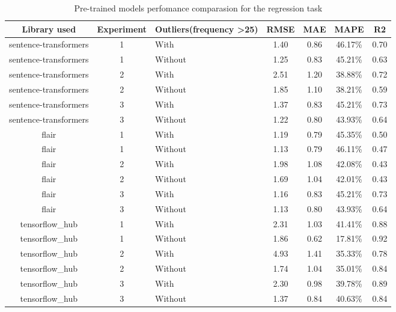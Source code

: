 \documentclass[12pt,MSc,a4paper,oneside]{muthesis}
\begin{document}
\begin{table}[h]
  \caption{Pre-trained models perfomance comparasion for the regression task}
  \label{tab:pretrained-models}
  \begin{tabularx}{\textwidth}{|C|C|L|C|C|C|C|}
    \toprule
    {Library used}&{Experiment}&{Outliers(frequency \textgreater25)}&{RMSE}&{MAE}&{MAPE}&{R2}\\
    \midrule
    sentence-transformers & 1 & With & 1.40 & 0.86 & 46.17\% & 0.70\\
    sentence-transformers & 1 & Without & 1.25 & 0.83 & 45.21\% & 0.63\\
    sentence-transformers & 2 & With & 2.51 & 1.20 & 38.88\% & 0.72\\
    sentence-transformers & 2 & Without & 1.85 & 1.10 & 38.21\% & 0.59\\
    sentence-transformers & 3 & With & 1.37 & 0.83 & 45.21\% & 0.73\\
    sentence-transformers & 3 & Without & 1.22 & 0.80 & 43.93\% & 0.64\\
    flair & 1 & With & 1.19 & 0.79 & 45.35\% & 0.50\\
    flair & 1 & Without & 1.13 & 0.79 & 46.11\% & 0.47\\
    flair & 2 & With & 1.98 & 1.08 & 42.08\% & 0.43\\
    flair & 2 & Without & 1.69 & 1.04 & 42.01\% & 0.43\\
    flair & 3 & With & 1.16 & 0.83 & 45.21\% & 0.73\\
    flair & 3 & Without & 1.13 & 0.80 & 43.93\% & 0.64\\
    tensorflow\_hub & 1 & With & 2.31 & 1.03 & 41.41\% & 0.88\\
    tensorflow\_hub & 1 & Without & 1.86 & 0.62 & 17.81\% & 0.92\\
    tensorflow\_hub & 2 & With & 4.93 & 1.41 & 35.33\% & 0.78\\
    tensorflow\_hub & 2 & Without & 1.74 & 1.04 & 35.01\% & 0.84\\
    tensorflow\_hub & 3 & With & 2.30 & 0.98 & 39.78\% & 0.89\\
    tensorflow\_hub & 3 & Without & 1.37 & 0.84 & 40.63\% & 0.84\\
  \bottomrule
\end{tabularx}
\end{table}
\end{document}
